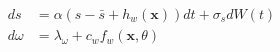 \begin{align}
    ds &= \alpha(s-\bar{s}+h_w(\mathbf x)) dt + \sigma_s dW(t) \\
    d\omega &= \lambda_\omega + c_w f_w(\mathbf x,\theta)
\end{align}